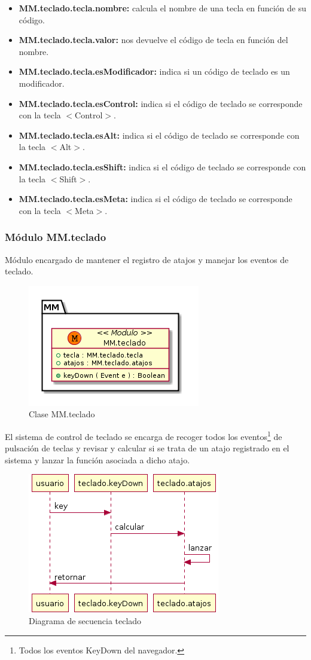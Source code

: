 \begin{itemize}
\item \textbf{MM.teclado.tecla.nombre:} calcula el nombre de una tecla en función de su código.
\item \textbf{MM.teclado.tecla.valor:} nos devuelve el código de tecla en función del nombre.
\item \textbf{MM.teclado.tecla.esModificador:} indica si un código de teclado es un modificador. 
\item \textbf{MM.teclado.tecla.esControl:} indica si el código de teclado se corresponde con la tecla $<$Control$>$.
\item \textbf{MM.teclado.tecla.esAlt:} indica si el código de teclado se corresponde con la tecla $<$Alt$>$.
\item \textbf{MM.teclado.tecla.esShift:} indica si el código de teclado se corresponde con la tecla $<$Shift$>$.
\item \textbf{MM.teclado.tecla.esMeta:} indica si el código de teclado se corresponde con la tecla $<$Meta$>$.
\end{itemize}


\subsubsection{Módulo MM.teclado}
Módulo encargado de mantener el registro de atajos y manejar los eventos de teclado.

\begin{figure}[tbph]
\centering
\includegraphics[width=0.4\linewidth]{imagenes/diagrama-clase-mm-teclado}
\caption{Clase MM.teclado}
\label{fig:diagrama-clase-mm-teclado}
\end{figure}

El sistema de control de teclado se encarga de recoger todos los eventos\footnote{Todos los eventos KeyDown del navegador.} de pulsación de teclas y revisar y calcular si se trata de un atajo registrado en el sistema y lanzar la función asociada a dicho atajo.

\begin{figure}[tbph]
\centering
\includegraphics[width=0.4\linewidth]{imagenes/diagrama-seq-teclado}
\caption{Diagrama de secuencia teclado}
\label{fig:diagrama-seq-teclado}
\end{figure}


